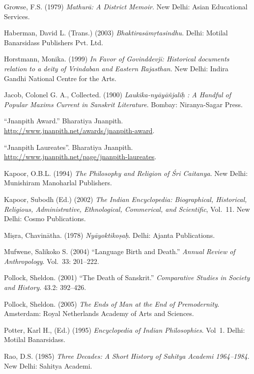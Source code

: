 \begin{thebibliography}{99}
Growse, F.S. (1979) {\sl Mathurā: A District Memoir}. New Delhi: Asian Educational Services. 

Haberman, David L. (Trans.) (2003) {\sl Bhaktirasāmṛtasindhu}. Delhi: Motilal Banarsidass Publishers Pvt. Ltd. 

Horstmann, Monika. (1999) {\sl In Favor of Govinddevjī: Historical documents relation to a deity of Vrindaban and Eastern Rajasthan}. New Delhi: Indira Gandhi National Centre for the Arts. 

Jacob, Colonel G. A., Collected. (1900) {\sl Laukika-nyāyāñjaliḥ : A Handful of Popular Maxims Current in Sanskrit Literature}. Bombay: Niranya-Sagar Press. 

“Jnanpith Award.” Bharatiya Jnanpith. \url{http://www.jnanpith.net/awards/jnanpith-award}.

“Jnanpith Laureates”. Bharatiya Jnanpith. \url{http://www.jnanpith.net/page/jnanpith-laureates}. 

Kapoor, O.B.L. (1994) {\sl The Philosophy and Religion of Śri Caitanya}. New Delhi: Munishiram Manoharlal Publishers. 

Kapoor, Subodh (Ed.) (2002) {\sl The Indian Encyclopedia: Biographical, Historical, Religious, 
Administrative, Ethnological, Commerical, and Scientific}, Vol.~11. New Delhi: Cosmo Publications. 

Miṣra, Chavinātha. (1978) {\sl Nyāyoktikoṣaḥ}. Delhi: Ajanta Publications. 

Mufwene, Salikoko S. (2004) “Language Birth and Death.” {\sl Annual Review of Anthropology}. Vol.~33: 201--222. 

Pollock, Sheldon. (2001) “The Death of Sanskrit.” {\sl Comparative Studies in Society and History}. 43.2: 392--426. 

Pollock, Sheldon. (2005) {\sl The Ends of Man at the End of Premodernity}. Amsterdam: Royal Netherlands Academy of Arts and Sciences. 

Potter, Karl H., (Ed.) (1995) {\sl Encyclopedia of Indian Philosophies}. Vol~1. Delhi: Motilal Banarsidass. 

Rao, D.S. (1985) {\sl Three Decades: A Short History of Sahitya Academi 1964--1984}. New Delhi: Sahitya Academi. 


\end{thebibliography}
